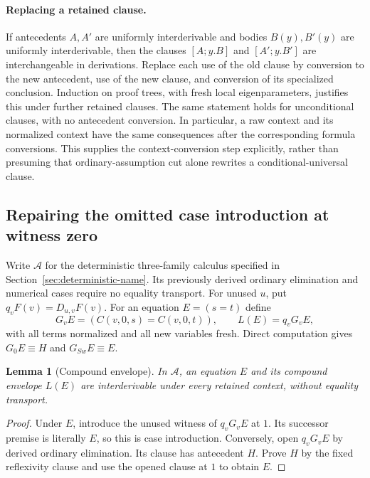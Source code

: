 \documentclass[11pt,a4paper]{article}
\newtheorem{lemma}[theorem]{Lemma}
\theoremstyle{definition}\newtheorem{definition}[theorem]{Definition}
\theoremstyle{remark}\newtheorem{remark}[theorem]{Remark}
\begin{document}
\paragraph{Replacing a retained clause.}
If antecedents $A,A'$ are uniformly interderivable and bodies $B(y),B'(y)$
are uniformly interderivable, then the clauses $[A;y.B]$ and
$[A';y.B']$ are interchangeable in derivations. Replace each use of the
old clause by conversion to the new antecedent, use of the new clause,
and conversion of its specialized conclusion. Induction on proof trees,
with fresh local eigenparameters, justifies this under further retained
clauses. The same statement holds for unconditional clauses, with no
antecedent conversion. In particular, a raw context and its normalized
context have the same consequences after the corresponding formula
conversions. This supplies the context-conversion step explicitly,
rather than presuming that ordinary-assumption cut alone rewrites a
conditional-universal clause.

\subsection{Repairing the omitted case introduction at witness zero}

Write $\mathcal A$ for the deterministic three-family calculus specified
in Section~\ref{sec:deterministic-name}. Its previously derived ordinary
elimination and numerical cases require no equality transport. For unused
$u$, put $q_v F(v)=D_{u,v}F(v)$. For an equation $E=(s=t)$ define
\[
 G_vE=(C(v,0,s)=C(v,0,t)),\qquad L(E)=q_vG_vE,
\]
with all terms normalized and all new variables fresh. Direct computation
gives $G_0E\equiv H$ and $G_{Sw}E\equiv E$.

\begin{lemma}[Compound envelope]
\label{lem:nb-envelope}
In $\mathcal A$, an equation $E$ and its compound envelope $L(E)$ are
interderivable under every retained context, without equality transport.
\end{lemma}
\begin{proof}
Under $E$, introduce the unused witness of $q_vG_vE$ at $1$. Its
successor premise is literally $E$, so this is case introduction.
Conversely, open $q_vG_vE$ by derived ordinary elimination. Its clause
has antecedent $H$. Prove $H$ by the fixed reflexivity clause and use
the opened clause at $1$ to obtain $E$.
\end{proof}
\end{document}
